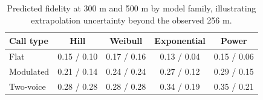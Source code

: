 \begin{table}[!ht]
\centering
\caption{Predicted fidelity at 300 m and 500 m by model family, illustrating extrapolation uncertainty beyond the observed 256 m.}
\label{tab:p5extra}
\small
\begin{tabular}{lcccc}
\toprule
Call type & Hill & Weibull & Exponential & Power \\
\midrule
Flat & 0.15 / 0.10 & 0.17 / 0.16 & 0.13 / 0.04 & 0.15 / 0.06 \\
Modulated & 0.21 / 0.14 & 0.24 / 0.24 & 0.27 / 0.12 & 0.29 / 0.15 \\
Two-voice & 0.28 / 0.28 & 0.28 / 0.28 & 0.34 / 0.19 & 0.35 / 0.21 \\
\bottomrule
\end{tabular}
\end{table}